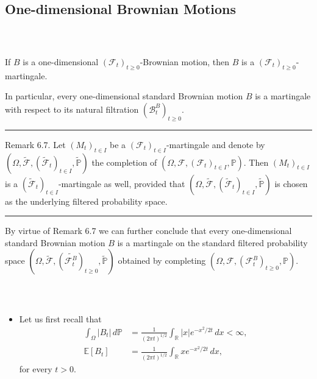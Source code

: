 \documentclass{beamer}
\numberwithin{equation}{section}
\newcommand{\task}[1]{
    \begin{center}
        \colorbox{red}{
            \textsf{
                \textbf{#1}
            }
        }
    \end{center}
}
\newenvironment{frame2}{\begin{frame}\frametitle{{\normalsize \secname} \\ {\large \subsecname}}}{\end{frame}}
\begin{document}
\subsection{One-dimensional Brownian Motions}

\begin{frame2}
    If $B$ is a one-dimensional $(\mathcal{F}_t)_{t\geq 0}$-Brownian motion, then $B$ is a $(\mathcal{F}_t)_{t\geq 0}$-martingale.

    In particular, every one-dimensional standard Brownian motion $B$ is a martingale with respect to its natural filtration $(\mathcal{B}_t^B)_{t\geq 0}$.
    \vspace{5pt}
    \hrule
    \vspace{5pt}
    Remark 6.7. Let $(M_t)_{t \in I}$ be a $(\mathcal{F}_t)_{t\in I}$-martingale and denote by $(\Omega, \tilde{\mathcal{F}},(\tilde{\mathcal{F}}_t)_{t\in I},\tilde{\mathbb{P}})$ the completion of $(\Omega, \mathcal{F},(\mathcal{F}_t)_{t\in I},\mathbb{P})$.
    Then $(M_t)_{t\in I}$ is a $(\tilde{\mathcal{F}}_t)_{t\in I}$-martingale as well, provided that $(\Omega, \tilde{\mathcal{F}},(\tilde{\mathcal{F}}_t)_{t\in I},\tilde{\mathbb{P}})$ is chosen as the underlying filtered probability space.
    \vspace{5pt}
    \hrule
    \vspace{5pt}
    By virtue of Remark 6.7 we can further conclude that every one-dimensional standard Brownian motion $B$ is a martingale on the standard filtered probability space $(\Omega, \tilde{\mathcal{F}},(\tilde{\mathcal{F}_t^B})_{t\geq 0},\tilde{\mathbb{P}})$ obtained by completing $(\Omega, \mathcal{F},(\mathcal{F}_t^B)_{t\geq 0},\mathbb{P})$.
\end{frame2}

\begin{frame2}
    \begin{itemize} 
        \item Let us first recall that
        \begin{align}
            \int_{\Omega} |B_t| \, d\mathbb{P} &= \frac{1}{(2\pi t)^{1/2}}\int_\mathbb{R} |x| e^{-x^2/2t} \, dx < \infty, \\
            \mathbb{E}[B_t] &= \frac{1}{(2\pi t)^{1/2}}\int_\mathbb{R}xe^{-x^2/2t} \, dx,
        \end{align}
        for every $t > 0$.
    \end{itemize}
\end{frame2}
\end{document}
